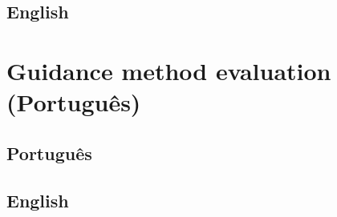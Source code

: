 \subsection{English}


\pagebreak

\section{Guidance method evaluation (Português)}
\label{apsec:guidace_evaluation}

\subsection{Português}


\FloatBarrier

\subsection{English}
